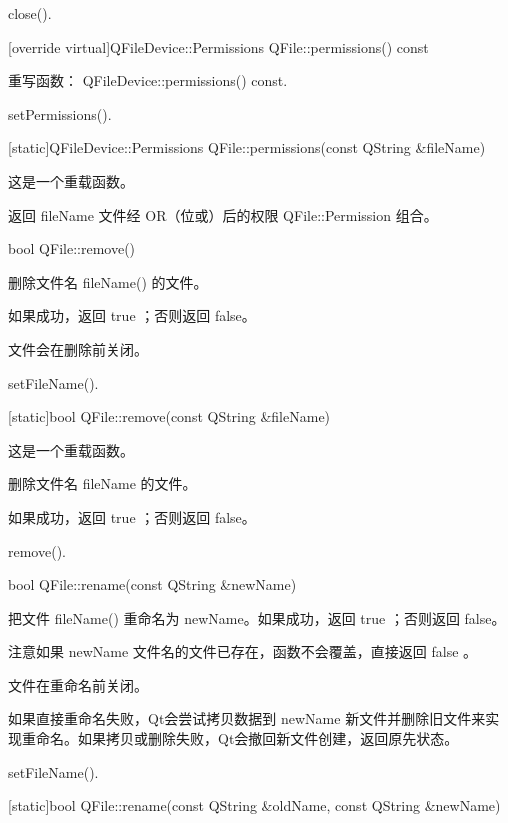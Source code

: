 \begin{notice}[另请参阅]
 close().
\end{notice}

[override virtual]QFileDevice::Permissions QFile::permissions() const

重写函数： QFileDevice::permissions() const.

\begin{notice}[另请参阅]
setPermissions().
\end{notice}

[static]QFileDevice::Permissions QFile::permissions(const QString \&fileName)

这是一个重载函数。

返回 fileName 文件经 OR（位或）后的权限 QFile::Permission 组合。

bool QFile::remove()

删除文件名 fileName() 的文件。

如果成功，返回 true ；否则返回 false。

文件会在删除前关闭。

\begin{notice}[另请参阅]
setFileName().
\end{notice}

[static]bool QFile::remove(const QString \&fileName)

这是一个重载函数。

删除文件名 fileName 的文件。

如果成功，返回 true ；否则返回 false。

\begin{notice}[另请参阅]
remove().
\end{notice}

bool QFile::rename(const QString \&newName)

把文件 fileName() 重命名为 newName。如果成功，返回 true ；否则返回 false。

注意如果 newName 文件名的文件已存在，函数不会覆盖，直接返回 false 。

文件在重命名前关闭。

如果直接重命名失败，Qt会尝试拷贝数据到 newName 新文件并删除旧文件来实现重命名。如果拷贝或删除失败，Qt会撤回新文件创建，返回原先状态。



\begin{notice}[另请参阅]
setFileName().
\end{notice}

[static]bool QFile::rename(const QString \&oldName, const QString \&newName)

